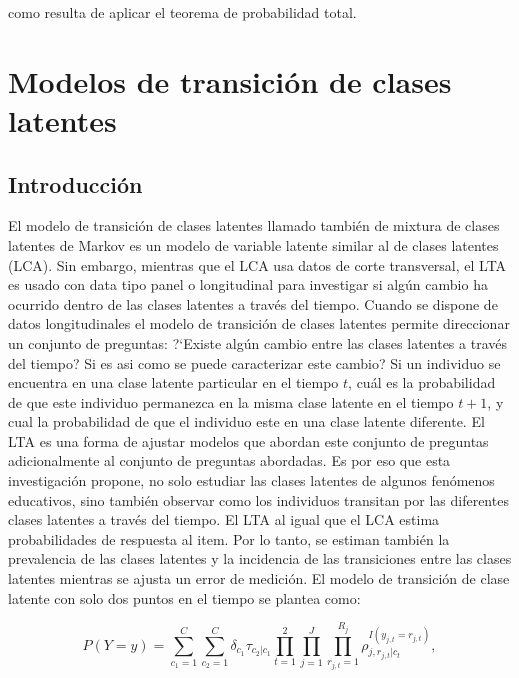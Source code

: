 		\noindent
		como resulta de aplicar el teorema de probabilidad total.
		
	\section{Modelos de transici\'{o}n de clases latentes}
	\label{sec:An\'{a}lisis de transici\'{o}n latente }
	
		\subsection{Introducci\'{o}n}
			El modelo de transici\'{o}n de clases latentes llamado tambi\'{e}n de mixtura de clases latentes de Markov es un modelo de variable latente similar al de clases latentes (LCA). Sin embargo, mientras que el LCA usa datos de corte transversal, el LTA es usado con data tipo panel o longitudinal para investigar si alg\'{u}n cambio ha ocurrido dentro de las clases latentes a trav\'{e}s del tiempo.
			Cuando se dispone de datos longitudinales el modelo de transici\'{o}n de clases latentes permite direccionar un conjunto de preguntas: ?`Existe alg\'{u}n cambio entre las clases latentes a trav\'{e}s del tiempo? Si es asi como se puede caracterizar este cambio? Si un individuo se encuentra en una clase latente particular en el tiempo $t$, cu\'{a}l es la probabilidad de que este individuo permanezca en la misma clase latente en el tiempo $t+1$, y cual la probabilidad de que el individuo este en una clase latente diferente. El LTA es una forma de ajustar modelos que abordan este conjunto de preguntas adicionalmente al conjunto de preguntas abordadas. 
			Es por eso que esta investigaci\'{o}n propone, no solo estudiar las clases latentes de algunos fen\'{o}menos educativos, sino tambi\'{e}n observar como los individuos transitan por las diferentes clases latentes a trav\'{e}s del tiempo. El LTA al igual que el LCA estima probabilidades de respuesta al item. Por lo tanto, se estiman tambi\'{e}n la prevalencia de las clases latentes y la incidencia de las transiciones entre las clases latentes mientras se ajusta un error de medici\'{o}n.     
			El modelo de transici\'{o}n de clase latente con solo dos puntos en el tiempo se plantea como:     
			
			\begin{equation}
				P(Y=y)=\sum _{ {c}_{1}=1 }^{C}{\sum _{ {c}_{2}=1 }^{C}{\delta _{c_1} \tau_{c_2|c_1} }}\prod _{ t=1 }^{ 2 }{  \prod_{ j=1 }^{J}{\prod_{ r_{j,t}=1 }^{R_j}{\rho_{j,r_{j,t}|c_t}^{I(y_{j,t}=r_{j,t})}  } }    }, \label{2.16}
			\end{equation}
			
